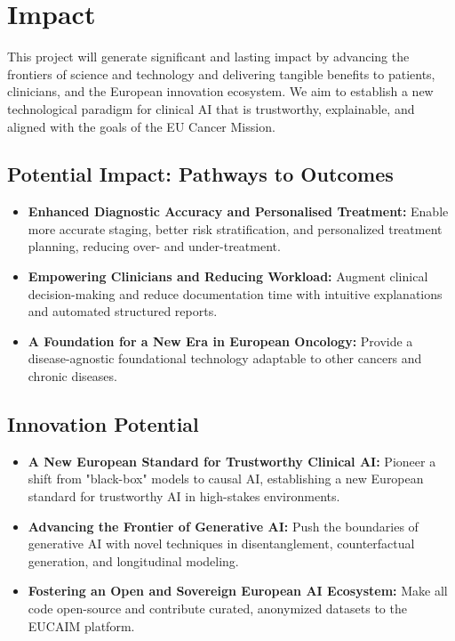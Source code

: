 \documentclass[11pt, a4paper]{article}
\begin{document}
\section{Impact}
This project will generate significant and lasting impact by advancing the frontiers of science and technology and delivering tangible benefits to patients, clinicians, and the European innovation ecosystem. We aim to establish a new technological paradigm for clinical AI that is trustworthy, explainable, and aligned with the goals of the EU Cancer Mission.

\subsection{Potential Impact: Pathways to Outcomes}
\begin{itemize}
    \item \textbf{Enhanced Diagnostic Accuracy and Personalised Treatment:} Enable more accurate staging, better risk stratification, and personalized treatment planning, reducing over- and under-treatment.
    \item \textbf{Empowering Clinicians and Reducing Workload:} Augment clinical decision-making and reduce documentation time with intuitive explanations and automated structured reports.
    \item \textbf{A Foundation for a New Era in European Oncology:} Provide a disease-agnostic foundational technology adaptable to other cancers and chronic diseases.
\end{itemize}

\subsection{Innovation Potential}
\begin{itemize}
    \item \textbf{A New European Standard for Trustworthy Clinical AI:} Pioneer a shift from "black-box" models to causal AI, establishing a new European standard for trustworthy AI in high-stakes environments.
    \item \textbf{Advancing the Frontier of Generative AI:} Push the boundaries of generative AI with novel techniques in disentanglement, counterfactual generation, and longitudinal modeling.
    \item \textbf{Fostering an Open and Sovereign European AI Ecosystem:} Make all code open-source and contribute curated, anonymized datasets to the EUCAIM platform.
\end{itemize}
\end{document}
